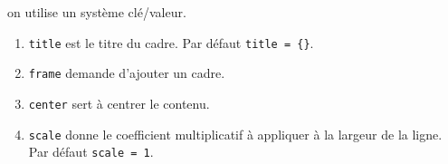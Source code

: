 \documentclass[12pt,a4paper]{article}
\theoremstyle{definition}
\begin{document}

\IDoption{} on utilise un système clé/valeur.
\begin{enumerate}
	\item \verb#title# est le titre du cadre.
	      Par défaut \verb#title = {}#.

	\item \verb#frame# demande d'ajouter un cadre.

	\item \verb#center# sert à centrer le contenu.

	\item \verb#scale# donne le coefficient multiplicatif à appliquer à la largeur de la ligne.
	      Par défaut \verb#scale = 1#.
\end{enumerate}
\end{document}
